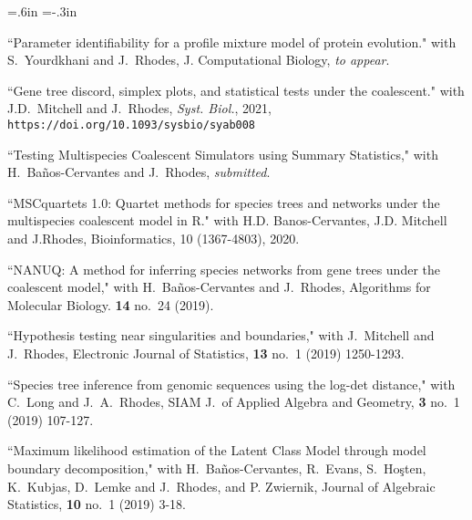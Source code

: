 \documentclass[10pt]{report}
\begin{document}
{ \leftskip=.6in \parindent=-.3in %
\parskip=3pt \parsep=0pt \itemsep=0pt

{
\begin{revnumerate}[44]
 \setlength{\itemsep}{2pt}
 \setlength{\parskip}{0pt}
 \setlength{\parsep}{0pt}
 
 \item
 ``Parameter identifiability for a profile mixture model of protein evolution."
 with S.~Yourdkhani and J.~Rhodes, J. Computational Biology, \emph{to appear}.
 
 \item 
``Gene tree discord, simplex plots, and statistical tests under the coalescent."
with J.D.~Mitchell and J.~Rhodes,  \emph{Syst. Biol.}, 2021, 
{\tt https://doi.org/10.1093/sysbio/syab008}

 \item ``Testing Multispecies Coalescent Simulators using Summary Statistics,"
 with H.~Ba\~nos-Cervantes and J.~Rhodes,
 \emph{submitted}.
 
  \item 
 ``MSCquartets 1.0: Quartet methods for species trees and networks under the multispecies coalescent model in R." 
 with H.D. Banos-Cervantes, J.D. Mitchell and J.Rhodes, Bioinformatics, 10 (1367-4803), 2020. 
 
 \item ``NANUQ: A method for inferring species networks
from gene trees under the coalescent model,"
 with H.~Ba\~nos-Cervantes and J.~Rhodes,
 Algorithms for Molecular Biology.
 {\bf 14} no.~24 (2019).
 
 \item 
 ``Hypothesis testing near singularities and boundaries,"
 with J.~Mitchell and J.~Rhodes,
Electronic Journal of Statistics,
{\bf13} no.~1 (2019) 1250-1293.
 
 \item 
 ``Species tree inference from genomic sequences using the log-det distance,"
 with C.~Long and J.~A.~Rhodes,
 SIAM J.~of Applied Algebra and Geometry,
 {\bf 3} no.~1 (2019) 107-127.
 
 \item 
 ``Maximum likelihood estimation of the Latent Class Model through model boundary decomposition,"
 with H.~Ba\~{n}os-Cervantes, R.~Evans, S.~Ho\c{s}ten, K.~Kubjas, D.~Lemke and J.~Rhodes, and P. Zwiernik,
 Journal of Algebraic Statistics,
{\bf 10} no.~1 (2019) 3-18. 
 

\end{revnumerate}}}
\end{document}
